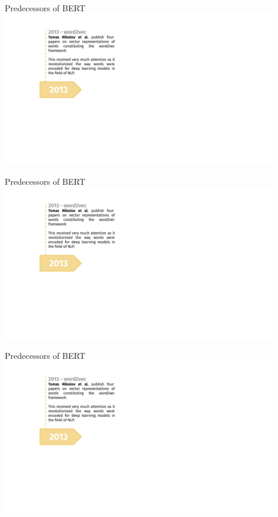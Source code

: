 \begin{frame}[noframenumbering]{Predecessors of BERT}
\hbox{\hspace{-3em} \includegraphics[width=12cm,page=3]{figure/transfer_learning_timeline1_nlp.pdf}}
\end{frame}
\begin{frame}[noframenumbering]{Predecessors of BERT}
\hbox{\hspace{-3em} \includegraphics[width=12cm,page=4]{figure/transfer_learning_timeline1_nlp.pdf}}
\end{frame}
\begin{frame}[noframenumbering]{Predecessors of BERT}
\hbox{\hspace{-3em} \includegraphics[width=12cm,page=5]{figure/transfer_learning_timeline1_nlp.pdf}}
\end{frame}

